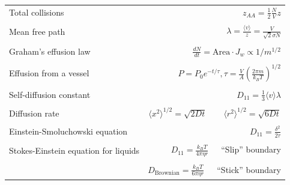 \documentclass[11pt]{article}
\begin{document}
\begin{table}
\begin{center}
\begin{tabular}{|lr|}
Total collisions &
$ \displaystyle z_{AA} = \frac{1}{2} \frac{N}{V} z$ \\ & \\

Mean free path &
$\displaystyle \lambda = \frac{ \langle v \rangle}{z} = \frac{V}{\sqrt{2} \sigma N} $
\\ & \\

Graham's effusion law & $\displaystyle \frac{dN}{dt}=\text{Area}\cdot  J_w \propto 1/m^{1/2} $
\\ & \\
Effusion from a vessel & $\displaystyle P=P_0 e^{-t/\tau}, \tau = \frac{V}{A}\left
  (\frac{2\pi m}{k_B T}\right )^{1/2} $ \\ & \\ 

Self-diffusion constant &
$\displaystyle D_{11} = \frac{1}{3}\langle v \rangle \lambda $ \\ & \\

Diffusion rate &
$\displaystyle \langle x^2 \rangle^{1/2} = \sqrt{2 D t} $\ \ \ \  $\langle r^2 \rangle^{1/2} = \sqrt{6
D t}$ \\ & \\

Einstein-Smoluchowski equation & $\displaystyle D_{11}= \frac{\delta^2}{2\tau}$ \\ & \\

Stokes-Einstein equation for liquids & $\displaystyle D_{11}=\frac{k_BT}{4\pi\eta r}$\ \ \
``Slip'' boundary \\
 & \\
 & $\displaystyle D_\mathrm{Brownian}=\frac{k_BT}{6\pi\eta r}$\ \ \ ``Stick'' boundary \\
\hline
    \end{tabular}
\end{center}
 \end{table}
\end{document}
